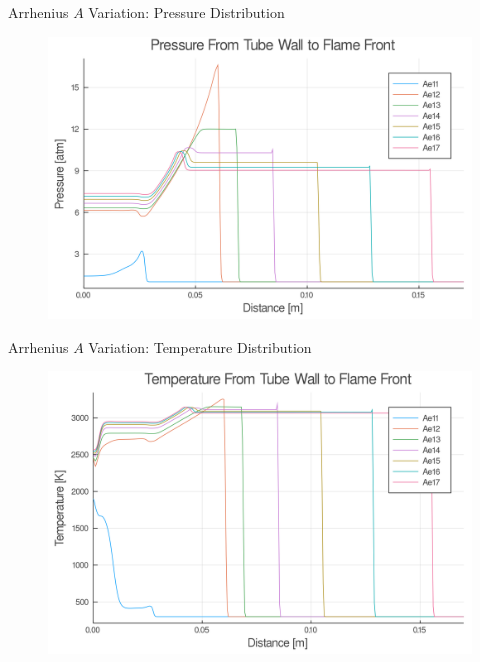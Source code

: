 \begin{frame}{Arrhenius $A$ Variation: Pressure Distribution}
\begin{figure}
\centering
\includegraphics[width=0.8\linewidth]{../figs/Atest/p.png}
\end{figure}
\end{frame}

\begin{frame}{Arrhenius $A$ Variation: Temperature Distribution}
\begin{figure}
\centering
\includegraphics[width=0.8\linewidth]{../figs/Atest/t.png}
\end{figure}
\end{frame}

